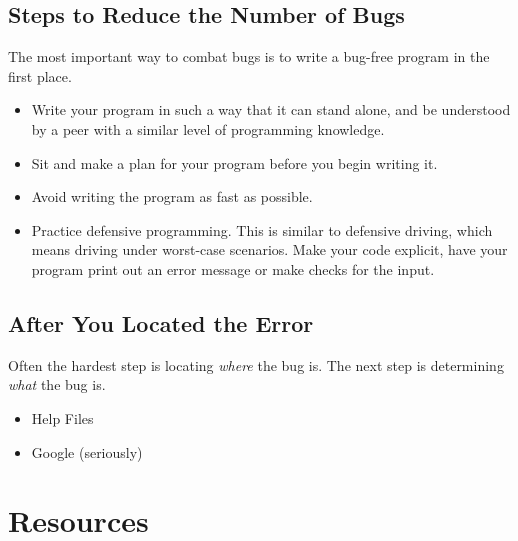 \documentclass[
]{book}
\begin{document}
\hypertarget{steps-to-reduce-the-number-of-bugs}{%
\subsection*{Steps to Reduce the Number of Bugs}\label{steps-to-reduce-the-number-of-bugs}}

The most important way to combat bugs is to write a bug-free program in the first place.

\begin{itemize}
\item
  Write your program in such a way that it can stand alone, and be understood by a peer with a similar level of programming knowledge.
\item
  Sit and make a plan for your program before you begin writing it.
\item
  Avoid writing the program as fast as possible.
\item
  Practice defensive programming. This is similar to defensive driving, which means driving under worst-case scenarios. Make your code explicit, have your program print out an error message or make checks for the input.
\end{itemize}

\hypertarget{after-you-located-the-error}{%
\subsection*{After You Located the Error}\label{after-you-located-the-error}}

Often the hardest step is locating \emph{where} the bug is. The next step is determining \emph{what} the bug is.

\begin{itemize}
\item
  Help Files
\item
  Google (seriously)
\end{itemize}

\hypertarget{resources}{%
\section{Resources}\label{resources}}
\end{document}

